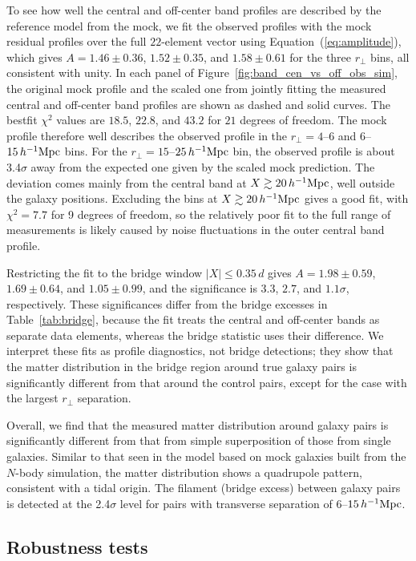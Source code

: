 \documentclass[twocolumn,anonymous,linenumbers]{aastex701}
\newcommand{\hinvMpc}{h^{-1}{\rm Mpc}}
\begin{document}
To see how well the central and off-center band profiles are described by the reference model from the mock, we fit the observed profiles with the mock residual profiles over the full
$22$-element vector using Equation~(\ref{eq:amplitude}), which gives
$A=1.46\pm0.36$, $1.52\pm0.35$, and $1.58\pm0.61$ for the three $r_\perp$ bins, all consistent with unity. 
In each panel of Figure~\ref{fig:band_cen_vs_off_obs_sim}, the original mock profile and the scaled one from jointly fitting the measured central and off-center band profiles are shown as dashed and solid curves. The bestfit $\chi^2$ values are $18.5$, $22.8$, and $43.2$ for $21$ degrees of freedom. The mock profile therefore well describes the observed profile in the $r_\perp=4$--$6$ and
$6$--$15\,\hinvMpc$ bins. For the $r_\perp=15$--$25\,\hinvMpc$ bin, the observed profile is about 3.4$\sigma$ away from the expected one given by the scaled mock prediction. The deviation comes mainly from the central band at $X \gtrsim 20\,\hinvMpc$, well outside the galaxy positions. Excluding the bins at $X \gtrsim  20\,\hinvMpc$ gives a good fit, with $\chi^2 = 7.7$ for 9 degrees of freedom, so the relatively poor fit to the full range of measurements is likely caused by noise fluctuations in the outer central band profile.

Restricting the fit to the bridge window
$|X|\leq0.35\,d$ gives $A=1.98\pm0.59$, $1.69\pm0.64$, and $1.05\pm0.99$, and the significance is $3.3$, $2.7$, and $1.1\sigma$, respectively. These significances differ from the bridge excesses in Table~\ref{tab:bridge}, because the fit treats the central and off-center bands as separate data elements, whereas the bridge statistic uses their difference. We interpret these fits as profile diagnostics, not bridge detections; they show that the matter distribution in the bridge region around true galaxy pairs is significantly different from that around the control pairs, except for the case with the largest $r_\perp$ separation.

Overall, we find that the measured matter distribution around galaxy pairs is significantly different from that from simple superposition of those from single galaxies. Similar to that seen in the model based on mock galaxies built from the $N$-body simulation, the matter distribution shows a quadrupole pattern, consistent with a tidal origin. The filament (bridge excess) between galaxy pairs is detected at the 2.4$\sigma$ level for pairs with transverse separation of $6$--$15\,\hinvMpc$.

\subsection{Robustness tests}
\label{sec:robust}
\end{document}
